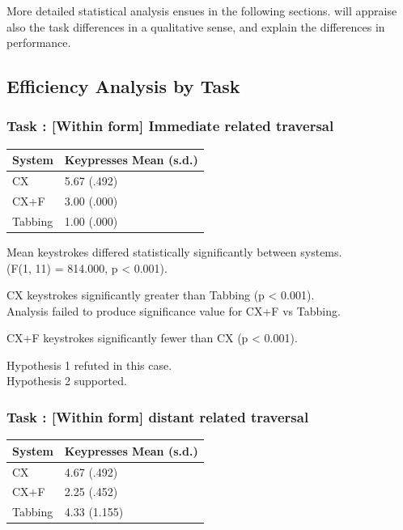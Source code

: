 \documentclass[11pt,openright,a4paper]{report}
\begin{document}
More detailed statistical analysis ensues in the following sections.  will appraise also the task differences in a qualitative sense, and explain the differences in performance.

\subsection{Efficiency Analysis by Task}
\newcommand{\navtask}[1]{ \subsubsection{Task : #1}}
\navtask{[Within form] Immediate related traversal}
\begin{tabular}{l l}
\hline\hline %
System & Keypresses Mean (s.d.) \\ [0.5ex] %
\hline %
CX & 5.67 (.492)\\
CX+F & 3.00 (.000)\\
Tabbing & 1.00 (.000)\\ [1ex] %
\hline %
\end{tabular}

Mean keystrokes differed statistically significantly between systems.\\
(F(1, 11) = 814.000, p < 0.001).

CX keystrokes significantly greater than Tabbing (p < 0.001).\\
Analysis failed to produce significance value for CX+F vs Tabbing.

CX+F keystrokes significantly fewer than CX (p < 0.001).

Hypothesis 1 refuted in this case.\\
Hypothesis 2 supported.

\navtask{[Within form] distant related traversal}
\begin{tabular}{l l}
\hline\hline %
System & Keypresses Mean (s.d.) \\ [0.5ex] %
\hline %
CX & 4.67 (.492)\\
CX+F & 2.25 (.452)\\
Tabbing & 4.33 (1.155)\\ [1ex] %
\hline %
\end{tabular}
\end{document}
